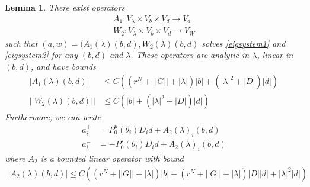 \documentclass[12pt]{article}
\newtheorem{lemma}{Lemma}
\begin{document}
\begin{lemma}\label{eiginv2}
There exist operators 
\begin{align*}
A_1 : V_\lambda \times V_b \times V_d \rightarrow V_a \\
W_2 : V_\lambda \times V_b \times V_d \rightarrow V_W
\end{align*}
such that $(a, w) = (A_1(\lambda)(b,d), W_2(\lambda)(b,d)$ solves \eqref{eigsystem1} and \eqref{eigsystem2} for any $(b, d)$ and $\lambda$. These operators are analytic in $\lambda$, linear in $(b,d)$, and have bounds 
\begin{align}
|A_1(\lambda)(b, d)| &\leq C \left( (r^N + ||G|| + |\lambda| ) |b| + (|\lambda|^2 + |D| ) |d| \right) \label{A1bound} \\
||W_2(\lambda)(b,d)|| &\leq C \left( |b| + (|\lambda|^2 + |D|) |d| \right) \label{W2bound}
\end{align}
Furthermore, we can write
\begin{align*}
a_i^+ &= P_0^u(\theta_i) D_i d + A_2(\lambda)_i(b,d) \\
a_i^- &= -P_0^s(\theta_i) D_i d + A_2(\lambda)_i(b,d)
\end{align*}
where $A_2$ is a bounded linear operator with bound
\begin{align}\label{A2bound}
|A_2(\lambda)(b,d)| \leq 
C\left( (r^N + ||G|| + |\lambda| )|b| + (r^N + ||G|| + |\lambda|)|D||d| + |\lambda|^2 |d|  \right)
\end{align}


\end{lemma}
\end{document}
